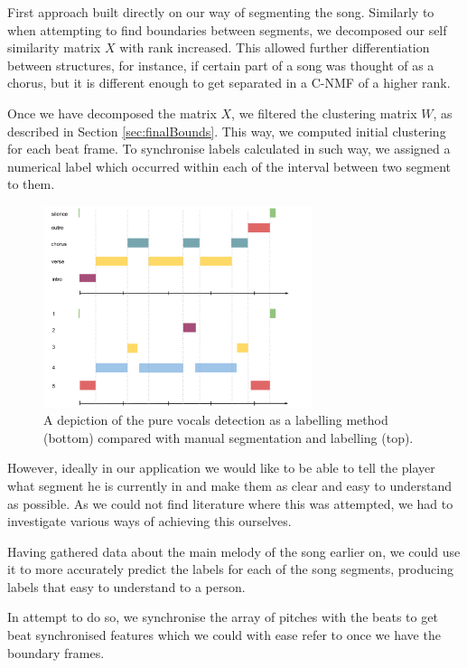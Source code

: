 First approach built directly on our way of segmenting the song.
Similarly to when attempting to find boundaries between segments, we decomposed our self similarity matrix $X$ with rank increased. This allowed further differentiation between structures, for instance, if certain part of a song was thought of as a chorus, but it is different enough to get separated in a C-NMF of a higher rank.

Once we have decomposed the matrix $X$, we filtered the clustering matrix $W$, as described in Section \ref{sec:finalBounds}. This way, we computed initial clustering for each beat frame. To synchronise labels calculated in such way, we assigned a numerical label which occurred within each of the interval between two segment to them.

\begin{figure}[h]
	\centering
   \includegraphics[width=0.7\textwidth]{Figures/NumericalLabels}
\caption{A depiction of the pure vocals detection as a labelling method (bottom) compared with manual segmentation and labelling (top).}
\label{fig:numericsimple}
\end{figure}

However, ideally in our application we would like to be able to tell the player what segment he is currently in and make them as clear and easy to understand as possible. As we could not find literature where this was attempted, we had to investigate various ways of achieving this ourselves. 

Having gathered data about the main melody of the song earlier on, we could use it to more accurately predict the labels for each of the song segments, producing labels that easy to understand to a person. 

In attempt to do so, we synchronise the array of pitches with the beats to get beat synchronised features which we could with ease refer to once we have the boundary frames. 

